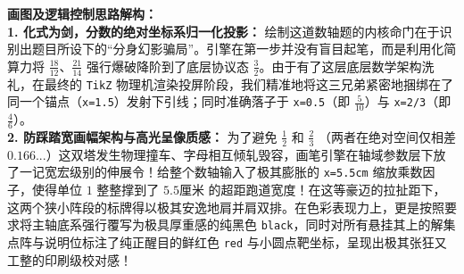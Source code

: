 \begin{center}
\end{center}

\vspace{0.4cm}
{\small\color{blue!70!black}
\textbf{画图及逻辑控制思路解构：}\\
\textbf{1. 化式为剑，分数的绝对坐标系归一化投影：} 绘制这道数轴题的内核命门在于识别出题目所设下的“分身幻影骗局”。引擎在第一步并没有盲目起笔，而是利用化简算力将 $\frac{18}{12}$、$\frac{21}{14}$ 强行爆破降阶到了底层协议态 $\frac{3}{2}$。由于有了这层底层数学架构洗礼，在最终的 \texttt{TikZ} 物理机渲染投屏阶段，我们精准地将这三兄弟紧密地捆绑在了同一个锚点（\texttt{x=1.5}）发射下引线；同时准确落子于 \texttt{x=0.5}（即 $\frac{5}{10}$）与 \texttt{x=2/3}（即 $\frac{4}{6}$）。\\
\textbf{2. 防踩踏宽画幅架构与高光呈像质感：} 为了避免 $\frac{1}{2}$ 和 $\frac{2}{3}$ （两者在绝对空间仅相差 $0.166...$）这双塔发生物理撞车、字母相互倾轧毁容，画笔引擎在轴域参数层下放了一记宽宏级别的伸展令！给整个数轴输入了极其膨胀的 \texttt{x=5.5cm} 缩放乘数因子，使得单位 $1$ 整整撑到了 $5.5\text{厘米}$ 的超距跑道宽度！在这等豪迈的拉扯距下，这两个狭小阵段的标牌得以极其安逸地肩并肩双排。在色彩表现力上，更是按照要求将主轴底系强行覆写为极具厚重感的纯黑色 \texttt{black}，同时对所有悬挂其上的解集点阵与说明位标注了纯正醒目的鲜红色 \texttt{red} 与小圆点靶坐标，呈现出极其张狂又工整的印刷级校对感！
}

